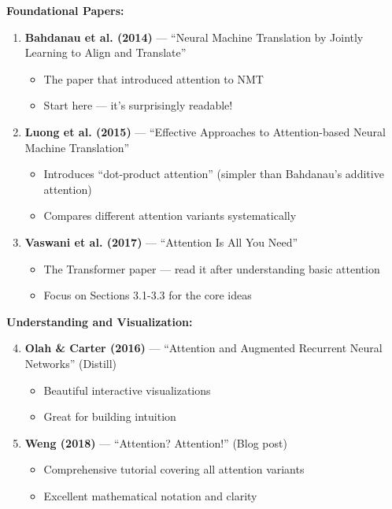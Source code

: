 \documentclass{article}
\begin{document}
\begin{tcolorbox}[colback=gray!5!white, colframe=gray!75!black, title=Recommended Reading List]
\textbf{Foundational Papers:}
\begin{enumerate}
    \item \textbf{Bahdanau et al. (2014)} — ``Neural Machine Translation by Jointly Learning to Align and Translate''
    \begin{itemize}
        \item The paper that introduced attention to NMT
        \item Start here — it's surprisingly readable!
    \end{itemize}

    \item \textbf{Luong et al. (2015)} — ``Effective Approaches to Attention-based Neural Machine Translation''
    \begin{itemize}
        \item Introduces ``dot-product attention'' (simpler than Bahdanau's additive attention)
        \item Compares different attention variants systematically
    \end{itemize}

    \item \textbf{Vaswani et al. (2017)} — ``Attention Is All You Need''
    \begin{itemize}
        \item The Transformer paper — read it after understanding basic attention
        \item Focus on Sections 3.1-3.3 for the core ideas
    \end{itemize}
\end{enumerate}

\textbf{Understanding and Visualization:}
\begin{enumerate}
    \setcounter{enumi}{3}
    \item \textbf{Olah \& Carter (2016)} — ``Attention and Augmented Recurrent Neural Networks'' (Distill)
    \begin{itemize}
        \item Beautiful interactive visualizations
        \item Great for building intuition
    \end{itemize}

    \item \textbf{Weng (2018)} — ``Attention? Attention!'' (Blog post)
    \begin{itemize}
        \item Comprehensive tutorial covering all attention variants
        \item Excellent mathematical notation and clarity
    \end{itemize}
\end{enumerate}


\end{tcolorbox}
\end{document}

